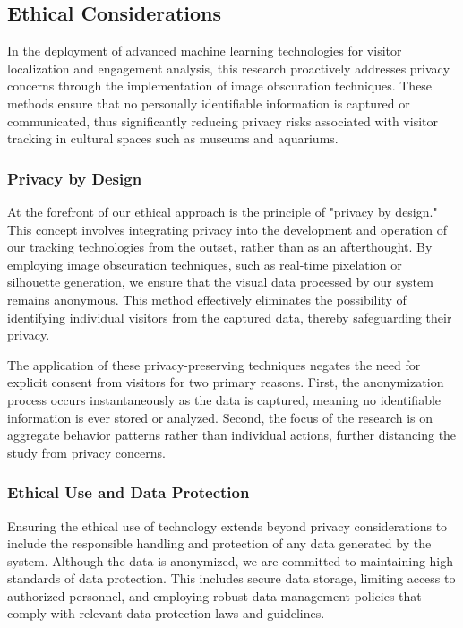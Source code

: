 \subsection{Ethical Considerations}
In the deployment of advanced machine learning technologies for visitor localization and engagement analysis, this research proactively addresses privacy concerns through the implementation of image obscuration techniques. These methods ensure that no personally identifiable information is captured or communicated, thus significantly reducing privacy risks associated with visitor tracking in cultural spaces such as museums and aquariums.

\subsubsection{Privacy by Design}
At the forefront of our ethical approach is the principle of "privacy by design." This concept involves integrating privacy into the development and operation of our tracking technologies from the outset, rather than as an afterthought. By employing image obscuration techniques, such as real-time pixelation or silhouette generation, we ensure that the visual data processed by our system remains anonymous. This method effectively eliminates the possibility of identifying individual visitors from the captured data, thereby safeguarding their privacy.

The application of these privacy-preserving techniques negates the need for explicit consent from visitors for two primary reasons. First, the anonymization process occurs instantaneously as the data is captured, meaning no identifiable information is ever stored or analyzed. Second, the focus of the research is on aggregate behavior patterns rather than individual actions, further distancing the study from privacy concerns.

\subsubsection{Ethical Use and Data Protection}
Ensuring the ethical use of technology extends beyond privacy considerations to include the responsible handling and protection of any data generated by the system. Although the data is anonymized, we are committed to maintaining high standards of data protection. This includes secure data storage, limiting access to authorized personnel, and employing robust data management policies that comply with relevant data protection laws and guidelines. 

